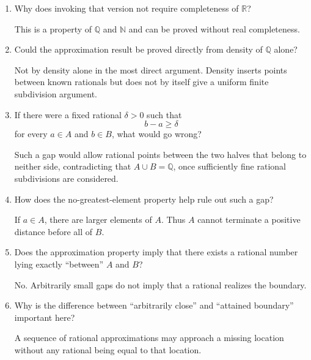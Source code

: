 \documentclass{essay}
\begin{document}
\begin{enumerate}[label=\arabic*., itemsep=10pt]
\begin{answer}
It suffices that for every positive rational $\varepsilon$ and positive rational $M$, there exists $n\in\mathbb{N}$ with
\[
M/n<\varepsilon.
\]
\end{answer}

\item Why does invoking that version not require completeness of $\mathbb{R}$?

\begin{answer}
This is a property of $\mathbb{Q}$ and $\mathbb{N}$ and can be proved without real completeness.
\end{answer}

\item Could the approximation result be proved directly from density of $\mathbb{Q}$ alone?

\begin{answer}
Not by density alone in the most direct argument. Density inserts points between known rationals but does not by itself give a uniform finite subdivision argument.
\end{answer}

\item If there were a fixed rational $\delta>0$ such that
\[
b-a\ge\delta
\]
for every $a\in A$ and $b\in B$, what would go wrong?

\begin{answer}
Such a gap would allow rational points between the two halves that belong to neither side, contradicting that $A\cup B=\mathbb{Q}$, once sufficiently fine rational subdivisions are considered.
\end{answer}

\item How does the no-greatest-element property help rule out such a gap?

\begin{answer}
If $a\in A$, there are larger elements of $A$. Thus $A$ cannot terminate a positive distance before all of $B$.
\end{answer}

\item Does the approximation property imply that there exists a rational number lying exactly ``between'' $A$ and $B$?

\begin{answer}
No. Arbitrarily small gaps do not imply that a rational realizes the boundary.
\end{answer}

\item Why is the difference between ``arbitrarily close'' and ``attained boundary'' important here?

\begin{answer}
A sequence of rational approximations may approach a missing location without any rational being equal to that location.
\end{answer}

\end{enumerate}
\end{document}
